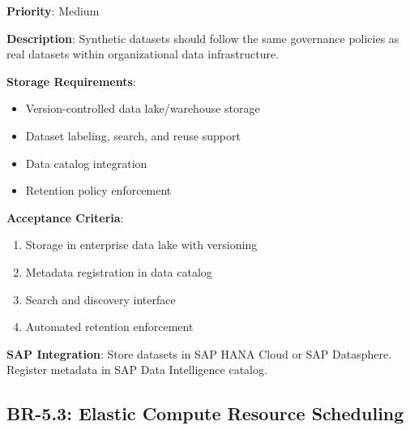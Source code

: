 \begin{tcolorbox}[colback=purple!5,colframe=purple!70,title=BR-5.2: Unified Data Governance]
\textbf{Priority}: Medium

\textbf{Description}: Synthetic datasets should follow the same governance
policies as real datasets within organizational data infrastructure.

\textbf{Storage Requirements}:
\begin{itemize}
  \item Version-controlled data lake/warehouse storage
  \item Dataset labeling, search, and reuse support
  \item Data catalog integration
  \item Retention policy enforcement
\end{itemize}

\textbf{Acceptance Criteria}:
\begin{enumerate}
  \item Storage in enterprise data lake with versioning
  \item Metadata registration in data catalog
  \item Search and discovery interface
  \item Automated retention enforcement
\end{enumerate}

\textbf{SAP Integration}: Store datasets in SAP HANA Cloud or SAP Datasphere.
Register metadata in SAP Data Intelligence catalog.
\end{tcolorbox}

\subsection{BR-5.3: Elastic Compute Resource Scheduling}

